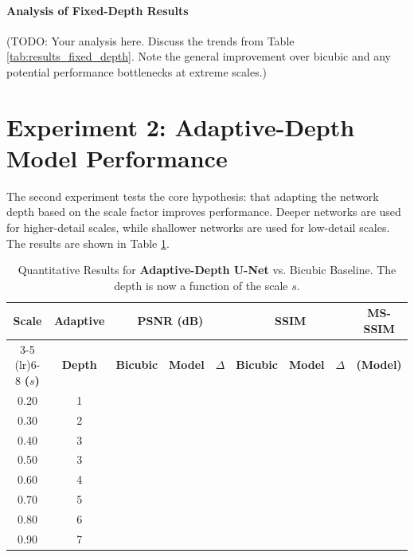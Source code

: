 \paragraph{Analysis of Fixed-Depth Results}
(TODO: Your analysis here. Discuss the trends from Table \ref{tab:results_fixed_depth}. Note the general improvement over bicubic and any potential performance bottlenecks at extreme scales.)

\section{Experiment 2: Adaptive-Depth Model Performance}
\label{sec:results_adaptive}

The second experiment tests the core hypothesis: that adapting the network depth based on the scale factor improves performance. Deeper networks are used for higher-detail scales, while shallower networks are used for low-detail scales. The results are shown in Table \ref{tab:results_adaptive_depth}.

\begin{table}[h!]
    \centering
    \caption{Quantitative Results for \textbf{Adaptive-Depth U-Net} vs. Bicubic Baseline. The depth is now a function of the scale $s$.}
    \label{tab:results_adaptive_depth}
    \begin{tabular}{c c | c c c | c c c | c}
        \toprule
        \textbf{Scale} & \textbf{Adaptive} & \multicolumn{3}{c}{\textbf{PSNR (dB)}} & \multicolumn{3}{c}{\textbf{SSIM}} & \textbf{MS-SSIM} \\
        \cmidrule(lr){3-5} \cmidrule(lr){6-8}
        \textbf{($s$)} & \textbf{Depth} & \textbf{Bicubic} & \textbf{Model} & \textbf{$\Delta$} & \textbf{Bicubic} & \textbf{Model} & \textbf{$\Delta$} & \textbf{(Model)} \\
        \midrule
        0.20 & 1 & & & & & & & \\
        0.30 & 2 & & & & & & & \\
        0.40 & 3 & & & & & & & \\
        0.50 & 3 & & & & & & & \\
        0.60 & 4 & & & & & & & \\
        0.70 & 5 & & & & & & & \\
        0.80 & 6 & & & & & & & \\
        0.90 & 7 & & & & & & & \\
        \bottomrule
    \end{tabular}
\end{table}

